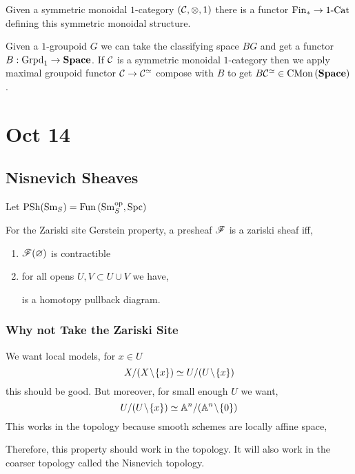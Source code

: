 \documentclass[12pt]{article}
\begin{document}
\begin{rmk}
Given a symmetric monoidal $1$-category $(\mathcal{C}, \otimes, 1)$ there is a functor $\mathrm{Fin}_* \to \text{1-Cat}$ defining this symmetric monoidal structure. 
\end{rmk}

Given a $1$-groupoid $G$ we can take the classifying space $BG$ and get a functor $B : \mathrm{Grpd}_1 \to \mathbf{Space}$. If $\mathcal{C}$ is a symmetric monoidal $1$-category then we apply maximal groupoid functor $\mathcal{C} \to \mathcal{C}^{\simeq}$ compose with $B$ to get $B \mathcal{C}^{\simeq} \in \mathrm{CMon}\left( \mathbf{Space} \right)$.


\section{Oct 14}


\subsection{Nisnevich Sheaves}

\newcommand{\Sm}{\mathrm{Sm}}
\newcommand{\Spc}{\mathrm{Spc}}
\newcommand{\PSh}{\mathrm{PSh}}
\newcommand{\pr}{\mathrm{pr}}

Let $\PSh(\Sm_S) = \Fun{\Sm_S^\op}{\Spc}$ 


For the Zariski site Gerstein property, a presheaf $\mathscr{F}$ is a zariski sheaf iff,
\begin{enumerate}
\item $\mathscr{F}(\varnothing)$ is contractible
\item for all opens $U, V \subset U \cup V$ we have,
\begin{center}
\end{center}
is a homotopy pullback diagram.
\end{enumerate}



\subsubsection{Why not Take the Zariski Site}

We want local models, for $x \in U$
\[ X / (X \! \setminus \! \{ x \}) \simeq U / (U \! \setminus \! \{ x \}) \]
this should be good. But moreover, for small enough $U$ we want,
\[ U / (U \! \setminus \! \{ x \}) \simeq \mathbb{A}^n / (\mathbb{A}^n \! \setminus \! \{ 0 \}) \]
This works in the \etale topology because smooth schemes are \etale locally affine space, 
\begin{center}
\end{center}
Therefore, this property should work in the \etale topology. It will also work in the coarser topology called the Nisnevich topology.
\end{document}
